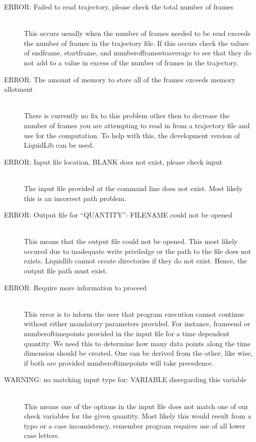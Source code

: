 \documentclass{article}
\begin{document}
\begin{description}
	\item[ERROR: Failed to read trajectory, please check the total number of frames] \hfill \\
	This occurs usually when the number of frames needed to be read exceeds the number of frames in the trajectory file.  If this occurs check the values of endframe, startframe, and numberofframestoaverage to see that they do not add to a value in excess of the number of frames in the trajectory.
	
	\item[ERROR: The amount of memory to store all of the frames exceeds memory allotment] \hfill \\
	There is currently no fix to this problem other then to decrease the number of frames you are attempting to read in from a trajectory file and use for the computation. To help with this, the development version of LiquidLib can be used. 
	
	\item[ERROR: Input file location, BLANK does not exist, please check input] \hfill \\
	The input file provided at the command line does not exist.  Most likely this is an incorrect path problem.
	
	\item[ERROR: Output file for ``QUANTITY'': FILENAME could not be opened] \hfill \\
	This means that the output file could not be opened.  This most likely occured due to inadequate write priviledge or the path to the file does not exists.  Liquidlib cannot create directories if they do not exist. Hence, the output file path must exist. 
	
	\item[ERROR: Require more information to proceed] \hfill \\
	This error is to inform the user that program execution cannot continue without either mandatory parameters provided. For instance, frameend or numberoftimepoints provided in the input file for a time dependent quantity.  We need this to determine how many data points along the time dimension should be created.  One can be derived from the other, like wise, if both are provided numberoftimepoints will take precedence. 
	
	
	
	
	\item[WARNING: no matching input type for: VARIABLE disregarding this variable] \hfill \\
	This means one of the options in the input file does not match one of our check variables for the given quantity.  Most likely this would result from a typo or a case inconsistency, remember program requires use of all lower case letters. 
	

\end{description}
\end{document}
